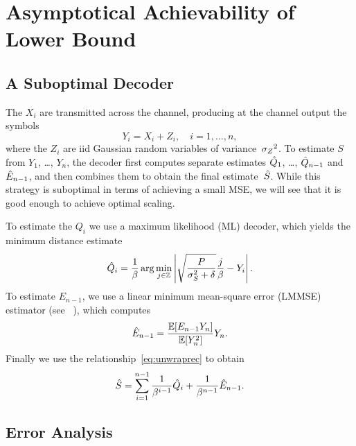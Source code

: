 \section{Asymptotical Achievability of Lower Bound}
\label{sec:achievable}

\subsection{A Suboptimal Decoder}

The $X_i$ are transmitted across the channel, producing at the channel output
the symbols
\begin{equation*}
  Y_i = X_i + Z_i, \quad i = 1, \dots, n,
\end{equation*}
where the $Z_i$ are iid Gaussian random variables of variance~${{\sigma_Z}^2}$. 
To estimate $S$ from  $Y_1$, \dots, $Y_n$, the decoder first
computes separate estimates $\hat{Q}_1$, \dots, $\hat{Q}_{n-1}$ and $\hat{E}_{n-1}$, and
then combines them to obtain the final estimate~$\hat{S}$.  While this strategy is
suboptimal in terms of achieving a small MSE, we will see that it is good enough
to achieve optimal scaling.

To estimate the $Q_i$ we use a maximum likelihood (ML) decoder, which yields the
minimum distance estimate
\begin{equation}
  \label{eq:mldecoder}
  \hat{Q}_i = \frac{1}{\beta} \arg \min_{j\in \mathbb{Z}} \left| \sqrt{\frac{P}{{\sigma_S^2}
  + \delta} } \frac{j}{\beta} - Y_i \right|.
\end{equation}
To estimate $E_{n-1}$, we use a linear minimum mean-square error (LMMSE)
estimator (see \eg~\cite[Section~8.3]{Scharf1990}), which computes
\begin{equation}
  \label{eq:lmmse}
  \hat{E}_{n-1} = \frac{\mathbb{E}[E_{n-1} Y_n]}{\mathbb{E}[Y_n^2]} Y_n.
\end{equation}
Finally we use the relationship~\eqref{eq:unwraprec} to obtain
\begin{equation}
  \label{eq:unwrapestim}
  \hat{S} = \sum_{i=1}^{n-1} \frac{1}{\beta^{i-1}} \hat{Q}_i + \frac{1}{\beta^{n-1}}
  \hat{E}_{n-1}.
\end{equation}


\subsection{Error Analysis}

